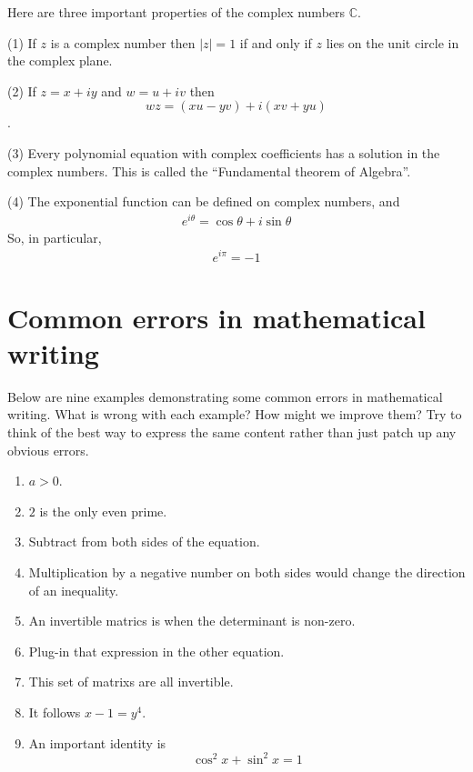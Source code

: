 \documentclass{UoESoMworkshop}
\begin{document}

Here are three important properties of the complex numbers $\mathbb{C}$.  

(1) If $z$ is a complex number then $|z|=1$ if and only if $z$ lies on the unit circle in the complex plane. 

(2) If $z=x+iy$ and $w=u+iv$ then $$wz= (xu-yv) + i(xv+yu)$$. %

(3) Every polynomial equation with complex coefficients has a solution in the complex numbers.  This is called the ``Fundamental theorem of Algebra''.   %

(4) The exponential function can be defined on complex numbers, and
\begin{align*}
    e^{i \theta} = \cos\theta + i \sin\theta
\end{align*}
    So, in particular, 
\begin{align*}
    e^{i\pi}=-1
\end{align*}



\section{Common errors in mathematical writing}

Below are nine examples demonstrating some common errors in 
mathematical writing. What is wrong with each example? How might we improve them? Try to think
of the best way to express the same content rather than just patch up any obvious errors.

\begin{exercise}[20 min]
\begin{enumerate}
\item $a>0$.
\item $2$ is the only even prime.
\item Subtract from both sides of the equation.
\item Multiplication by a negative number on both sides would change the direction of an inequality.
\item An invertible matrics is when the determinant is non-zero. 
\item Plug-in that expression in the other equation.
\item This set of matrixs are all invertible. 
\item It follows $x−1 = y^4$.
\item An important identity is \[ \cos^2x + \sin^2x = 1\]
\end{enumerate}
\end{exercise}
\end{document}
